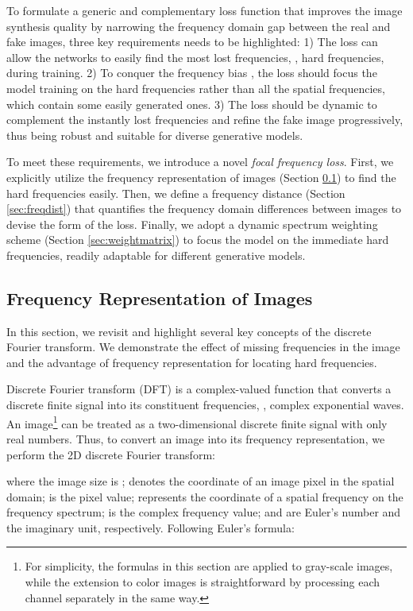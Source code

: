 \documentclass[10pt,twocolumn,letterpaper]{article}
\begin{document}
To formulate a generic and complementary loss function that improves the image synthesis quality by narrowing the frequency domain gap between the real and fake images,
three key requirements needs to be highlighted:
1) The loss can allow the networks to easily find the most lost frequencies, \ie, hard frequencies, during training.
2) To conquer the frequency bias \cite{spectralbias,fprinciple}, the loss should focus the model training on the hard frequencies rather than all the spatial frequencies, which contain some easily generated ones.
3) The loss should be dynamic to complement the instantly lost frequencies and refine the fake image progressively, thus being robust and suitable for diverse generative models.

To meet these requirements, we introduce a novel \textit{focal frequency loss}.
First, we explicitly utilize the frequency representation of images (Section \ref{sec:freqrepre}) to find the hard frequencies easily.
Then, we define a frequency distance (Section \ref{sec:freqdist}) that quantifies the frequency domain differences between images to devise the form of the loss.
Finally, we adopt a dynamic spectrum weighting scheme (Section \ref{sec:weightmatrix}) to focus the model on the immediate hard frequencies, readily adaptable for different generative models.
\fi

\subsection{Frequency Representation of Images}
\label{sec:freqrepre}

In this section, we revisit and highlight several key concepts of the discrete Fourier transform. We demonstrate the effect of missing frequencies in the image and the advantage of frequency representation for locating hard frequencies.


Discrete Fourier transform (DFT) is a complex-valued function that converts a discrete finite signal into its constituent frequencies, \ie, complex exponential waves.
An image\footnote{\hspace{0.07cm}For simplicity, the formulas in this section are applied to gray-scale images, while the extension to color images is straightforward by processing each channel separately in the same way.} can be treated as a two-dimensional discrete finite signal with only real numbers. Thus, to convert an image into its frequency representation, we perform the 2D discrete Fourier transform:

where the image size is ;  denotes the coordinate of an image pixel in the spatial domain;  is the pixel value;  represents the coordinate of a spatial frequency on the frequency spectrum;   is the complex frequency value;  and  are Euler's number and the imaginary unit, respectively.
Following Euler's formula:
\end{document}
